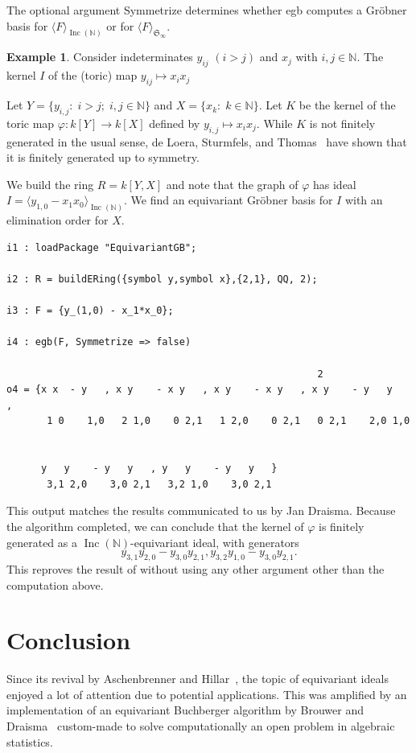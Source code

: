 \documentclass[10pt]{amsart}
\theoremstyle{definition}
\newtheorem{example}[theorem]{Example}
\theoremstyle{remark}
\numberwithin{equation}{section}
\newenvironment{Macaulay2}{ \begin{spacing}{0.4} %
\smallskip } { \smallskip %
\end{spacing} }
\newcommand{\B}[1]{\mathbb #1}
\newcommand{\F}[1]{\mathfrak #1}
\newcommand{\<}{\langle}
\renewcommand{\>}{\rangle}
\newcommand{\ideal}[1]{\langle #1 \rangle}
\newcommand{\Inc}{\operatorname{Inc}(\B N)}
\begin{document}
The optional argument {\ttfamily Symmetrize} determines whether {\ttfamily egb} computes a Gr\"obner basis for $\ideal{F}_{\Inc}$ or for $\ideal{F}_{\F S_\infty}$.

\begin{example}
Consider indeterminates $y_{ij}$ $(i > j)$ and $x_j$ with $i,j \in \mathbb N$.  The kernel $I$ of the (toric) map $y_{ij} \mapsto x_i x_j$ 

Let $Y = \{y_{i,j}:\; i > j;\; i,j \in \B N\}$ and $X = \{x_k:\; k \in \B N\}$.  Let $K$ be the kernel of the toric map $\varphi:k[Y] \to k[X]$ defined by $y_{i,j} \mapsto x_ix_j$. While $K$ is not finitely generated in the usual sense, de Loera, Sturmfels, and Thomas~\cite{deLoera-Sturmfels-Thomas} have shown that it is finitely generated up to symmetry.

We build the ring $R = k[Y,X]$ and note that the graph of $\varphi$ has ideal $I = \ideal{y_{1,0} - x_1x_0}_{\Inc}$.  We find an equivariant Gr\"obner basis for $I$ with an elimination order for $X$.
 \begin{Macaulay2}
\begin{verbatim}
i1 : loadPackage "EquivariantGB";

i2 : R = buildERing({symbol y,symbol x},{2,1}, QQ, 2);

i3 : F = {y_(1,0) - x_1*x_0};

i4 : egb(F, Symmetrize => false)

                                                      2
o4 = {x x  - y   , x y    - x y   , x y    - x y   , x y    - y   y   ,
       1 0    1,0   2 1,0    0 2,1   1 2,0    0 2,1   0 2,1    2,0 1,0


      y   y    - y   y   , y   y    - y   y   }
       3,1 2,0    3,0 2,1   3,2 1,0    3,0 2,1

\end{verbatim}
\end{Macaulay2}
This output matches the results communicated to us by Jan Draisma.
Because the algorithm completed, we can conclude that the kernel of $\varphi$ is finitely generated as a $\Inc$-equivariant ideal, with generators
\[ y_{3,1}y_{2,0} - y_{3,0}y_{2,1}, y_{3,2}y_{1,0} - y_{3,0}y_{2,1}. \]
This reproves the result of \cite{deLoera-Sturmfels-Thomas} without using any other argument other than the computation above.
\end{example}

\section{Conclusion}
Since its revival by Aschenbrenner and Hillar~\cite{Aschenbrenner-Hillar:finite-generation}, the topic of equivariant ideals enjoyed a lot of attention due to potential applications. This was amplified by an  implementation of an equivariant Buchberger algorithm by Brouwer and Draisma~\cite{Brouwer-Draisma} custom-made to solve computationally an open problem in algebraic statistics.
\end{document}
